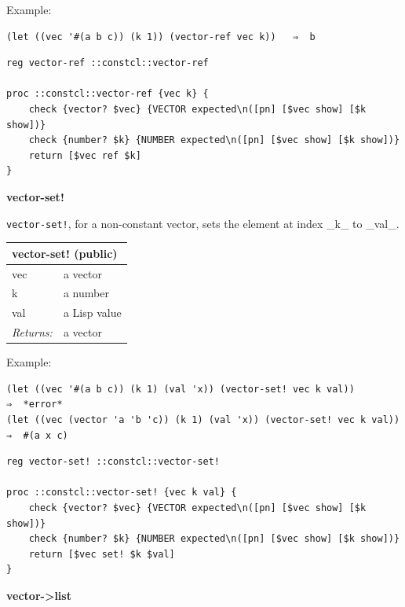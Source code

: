 \documentclass[twoside,9pt]{report}
\begin{document}
Example:

\noindent\makebox[\linewidth]{\rule{\linewidth}{0.4pt}}
\begin{lstlisting}
(let ((vec '#(a b c)) (k 1)) (vector-ref vec k))   ⇒  b
\end{lstlisting}
\noindent\makebox[\linewidth]{\rule{\linewidth}{0.4pt}}
\noindent\makebox[\linewidth]{\rule{\linewidth}{0.4pt}}
\begin{lstlisting}
reg vector-ref ::constcl::vector-ref
 
proc ::constcl::vector-ref {vec k} {
    check {vector? $vec} {VECTOR expected\n([pn] [$vec show] [$k show])}
    check {number? $k} {NUMBER expected\n([pn] [$vec show] [$k show])}
    return [$vec ref $k]
}
\end{lstlisting}
\noindent\makebox[\linewidth]{\rule{\linewidth}{0.4pt}}

\textbf{vector-set!}


\texttt{vector-set!}, for a non-constant vector, sets the element at index \_k\_ to \_val\_.

\begin{tabular}{ |l l| }
\hline
\multicolumn{2}{|l|}{vector-set! (public)} \\
\hline
vec & a vector \\
k & a number \\
val & a Lisp value \\
\textit{Returns:} & a vector \\
\hline
\end{tabular}


Example:

\noindent\makebox[\linewidth]{\rule{\linewidth}{0.4pt}}
\begin{lstlisting}
(let ((vec '#(a b c)) (k 1) (val 'x)) (vector-set! vec k val))           ⇒  *error*
(let ((vec (vector 'a 'b 'c)) (k 1) (val 'x)) (vector-set! vec k val))   ⇒  #(a x c)
\end{lstlisting}
\noindent\makebox[\linewidth]{\rule{\linewidth}{0.4pt}}
\noindent\makebox[\linewidth]{\rule{\linewidth}{0.4pt}}
\begin{lstlisting}
reg vector-set! ::constcl::vector-set!
 
proc ::constcl::vector-set! {vec k val} {
    check {vector? $vec} {VECTOR expected\n([pn] [$vec show] [$k show])}
    check {number? $k} {NUMBER expected\n([pn] [$vec show] [$k show])}
    return [$vec set! $k $val]
}
\end{lstlisting}
\noindent\makebox[\linewidth]{\rule{\linewidth}{0.4pt}}

\textbf{vector->list}
\end{document}
